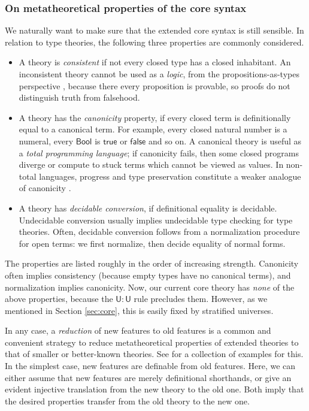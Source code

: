 \documentclass[acmsmall,review,anonymous,prologue,dvipsnames]{acmart}\settopmatter{printfolios=true,printccs=false,printacmref=false}
\renewcommand{\U}{\mathsf{U}}
\newcommand{\true}{\mathsf{true}}
\newcommand{\false}{\mathsf{false}}
\theoremstyle{remark}
\begin{document}
\subsubsection{On metatheoretical properties of the core syntax}
We naturally want to make sure that the extended core syntax is still sensible.
In relation to type theories, the following three properties are commonly
considered.
\begin{itemize}
  \item A theory is \emph{consistent} if not every closed type has a closed
    inhabitant. An inconsistent theory cannot be used as a \emph{logic}, from
    the propositions-as-types perspective \cite[Chapter~1]{hottbook}, because
    there every proposition is provable, so proofs do not distinguish truth from
    falsehood.
  \item A theory has the \emph{canonicity} property, if every closed term is
    definitionally equal to a canonical term. For example, every closed natural
    number is a numeral, every $\mathsf{Bool}$ is $\true$ or $\false$ and so
    on. A canonical theory is useful as a \emph{total programming language}; if
    canonicity fails, then some closed programs diverge or compute to stuck
    terms which cannot be viewed as values. In non-total languages, progress and
    type preservation constitute a weaker analogue of canonicity
    \cite[Chapter~6]{harper2016practical}.
  \item A theory has \emph{decidable conversion}, if definitional equality is
    decidable. Undecidable conversion usually implies undecidable type checking
    for type theories. Often, decidable conversion follows from a normalization
    procedure for open terms: we first normalize, then decide equality of normal
    forms.
\end{itemize}


The properties are listed roughly in the order of increasing
strength. Canonicity often implies consistency (because empty types have no
canonical terms), and normalization implies canonicity. Now, our current core
theory has \emph{none} of the above properties, because the $\U : \U$ rule
precludes them. However, as we mentioned in Section \ref{sec:core}, this is
easily fixed by stratified universes.

In any case, a \emph{reduction} of new features to old features is a common and
convenient strategy to reduce metatheoretical properties of extended theories to
that of smaller or better-known theories. See \citet{next700} for a collection
of examples for this. In the simplest case, new features are definable from old
features. Here, we can either assume that new features are merely definitional
shorthands, or give an evident injective translation from the new theory to the
old one. Both imply that the desired properties transfer from the old theory to
the new one.
\end{document}
